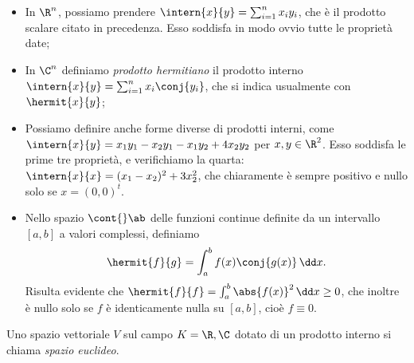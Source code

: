 \begin{itemize}
	\item In $\R^n$, possiamo prendere $\intern{  x}{  y}=\sum_{i=1}^nx_iy_i$, che è il prodotto scalare citato in precedenza.
		Esso soddisfa in modo ovvio tutte le proprietà date;
	\item In $\C^n$ definiamo \emph{prodotto hermitiano} il prodotto interno $\intern{  x}{  y}=\sum_{i=1}^nx_i\conj{y_i}$, che si indica usualmente con $\hermit{  x}{  y}$;
	\item Possiamo definire anche forme diverse di prodotti interni, come $\intern{  x}{  y}=x_1y_1-x_2y_1-x_1y_2+4x_2y_2$ per $  x,  y\in\R^2$.
		Esso soddisfa le prime tre proprietà, e verifichiamo la quarta: $\intern{  x}{  x}=(x_1-x_2)^2+3x_2^2$, che chiaramente è sempre positivo e nullo solo se $  x=(0,0)^t$.
	\item Nello spazio $\cont{}\ab$ delle funzioni continue definite da un intervallo $[a,b]$ a valori complessi, definiamo
		\begin{equation*}
			\hermit{f}{g}=\int_a^bf(x)\conj{g(x)}\,\dd x.
		\end{equation*}
		Risulta evidente che $\hermit{f}{f}=\int_a^b\abs{f(x)}^2\,\dd x\geq 0$, che inoltre è nullo solo se $f$ è identicamente nulla su $[a,b]$, cioè $f\equiv 0$.
\end{itemize}

\begin{definizione} \label{d:spazio-euclideo}
	Uno spazio vettoriale $V$ sul campo $K=\R,\C$ dotato di un prodotto interno si chiama \emph{spazio euclideo}.
\end{definizione}

